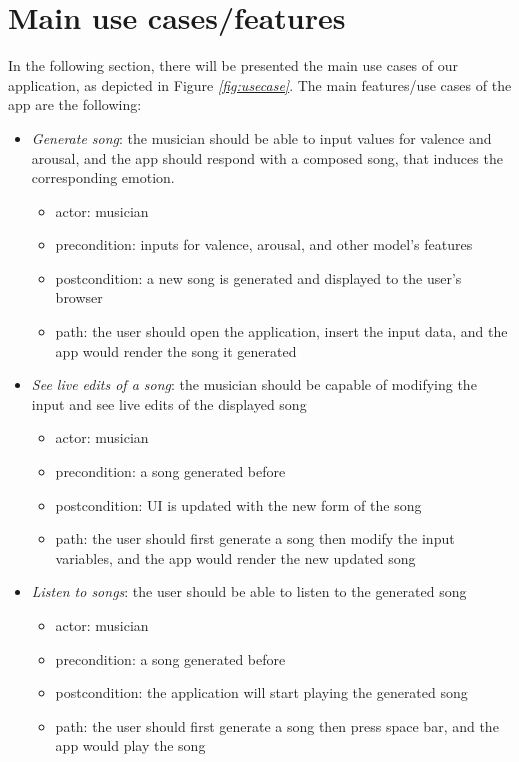 \section{Main use cases/features}
In the following section,
there will be presented the main use cases of our application,
as depicted in Figure \emph{\ref{fig:usecase}}.
The main features/use cases of the app are the following:
\begin{itemize}
  \item{
        \emph{Generate song}: the musician should be able to input values
        for valence and arousal, and the app should respond with a composed song,
        that induces the corresponding emotion.
        \begin{itemize}
          \item actor: musician
          \item precondition: inputs for valence, arousal, and other model's features
          \item postcondition: a new song is generated and displayed to the user's browser
          \item path: the user should open the application, insert the input data, and the app would render the song it generated
        \end{itemize}
        }
  \item{
        \emph{See live edits of a song}: the musician should be capable of modifying the input and see live edits of the displayed song
        \begin{itemize}
          \item actor: musician
          \item precondition: a song generated before
          \item postcondition: UI is updated with the new form of the song
          \item path: the user should first generate a song then modify the input variables, and the app would render the new updated song
        \end{itemize}
        }
  \item{
        \emph{Listen to songs}: the user should be able to listen to the generated song
        \begin{itemize}
          \item actor: musician
          \item precondition: a song generated before
          \item postcondition: the application will start playing the generated song
          \item path: the user should first generate a song then press space bar, and the app would play the song
        \end{itemize}
        }
\end{itemize}

